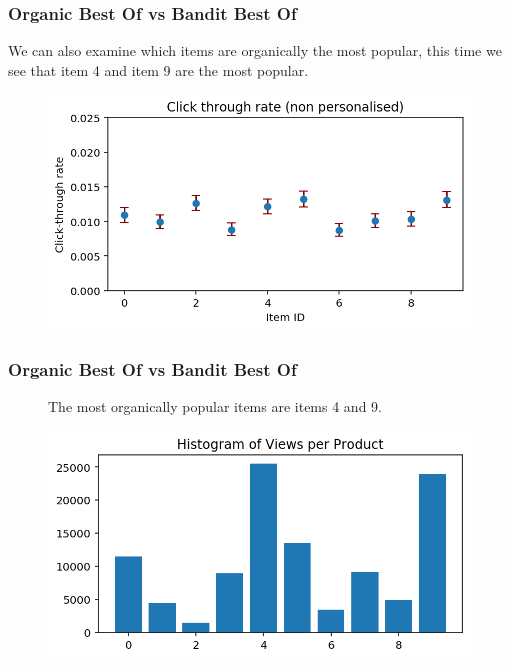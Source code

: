 \begin{frame}
\frametitle{Organic Best Of vs Bandit Best Of}

We can also examine which items are organically the most popular, this time we see that item 4 and item 9 are the most popular.

\begin{figure}[h!]
\includegraphics[scale=0.4]{images/organic_bestof1.png}
\centering
\label{motex1}
\end{figure}
\end{frame}

\begin{frame}
\frametitle{Organic Best Of vs Bandit Best Of}


\begin{figure}[h!]

  The most organically popular items are items 4 and 9.

  \includegraphics[scale=0.4]{images/organic_bestof2.png}
\centering
\label{motex1}
\end{figure}
\end{frame}


